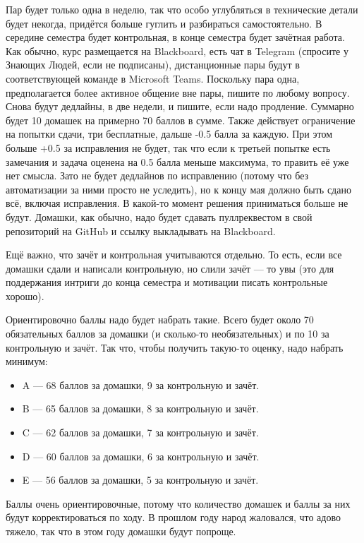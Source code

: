 \documentclass[a5paper]{article}
\begin{document}
Пар будет только одна в неделю, так что особо углубляться в технические детали будет некогда, придётся больше гуглить и разбираться самостоятельно. В середине семестра будет контрольная, в конце семестра будет зачётная работа. Как обычно, курс размещается на Blackboard, есть чат в Telegram (спросите у Знающих Людей, если не подписаны), дистанционные пары будут в соответствующей команде в Microsoft Teams. Поскольку пара одна, предполагается более активное общение вне пары, пишите по любому вопросу. Снова будут дедлайны, в две недели, и пишите, если надо продление. Суммарно будет 10 домашек на примерно 70 баллов в сумме. Также действует ограничение на попытки сдачи, три бесплатные, дальше -0.5 балла за каждую. При этом больше +0.5 за исправления не будет, так что если к третьей попытке есть замечания и задача оценена на 0.5 балла меньше максимума, то править её уже нет смысла. Зато не будет дедлайнов по исправлению (потому что без автоматизации за ними просто не уследить), но к концу мая должно быть сдано всё, включая исправления. В какой-то момент решения приниматься больше не будут. Домашки, как обычно, надо будет сдавать пуллреквестом в свой репозиторий на GitHub и ссылку выкладывать на Blackboard.

Ещё важно, что зачёт и контрольная учитываются отдельно. То есть, если все домашки сдали и написали контрольную, но слили зачёт --- то увы (это для поддержания интриги до конца семестра и мотивации писать контрольные хорошо).

Ориентировочно баллы надо будет набрать такие. Всего будет около 70 обязательных баллов за домашки (и сколько-то необязательных) и по 10 за контрольную и зачёт. Так что, чтобы получить такую-то оценку, надо набрать минимум:
\begin{itemize}
    \item A --- 68 баллов за домашки, 9 за контрольную и зачёт.
    \item B --- 65 баллов за домашки, 8 за контрольную и зачёт.
    \item C --- 62 баллов за домашки, 7 за контрольную и зачёт.
    \item D --- 60 баллов за домашки, 6 за контрольную и зачёт.
    \item E --- 56 баллов за домашки, 5 за контрольную и зачёт.
\end{itemize}

Баллы очень ориентировочные, потому что количество домашек и баллы за них будут корректироваться по ходу. В прошлом году народ жаловался, что адово тяжело, так что в этом году домашки будут попроще.
\end{document}
